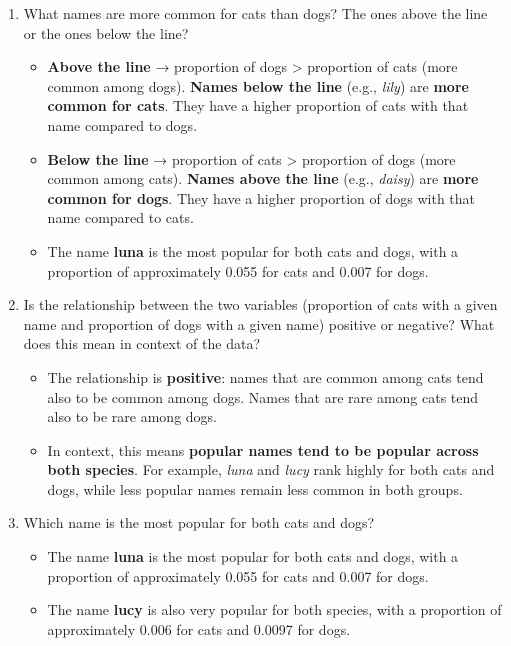 \documentclass[
]{article}
\providecommand{\tightlist}{%
  \setlength{\itemsep}{0pt}\setlength{\parskip}{0pt}}
\begin{document}
\begin{enumerate}
\def\labelenumi{\arabic{enumi}.}
\tightlist
\item
  What names are more common for cats than dogs? The ones above the line
  or the ones below the line?

  \begin{itemize}
  \tightlist
  \item
    \textbf{Above the line} → proportion of dogs \textgreater{}
    proportion of cats (more common among dogs). \textbf{Names below the
    line} (e.g., \emph{lily}) are \textbf{more common for cats}. They
    have a higher proportion of cats with that name compared to dogs.
  \item
    \textbf{Below the line} → proportion of cats \textgreater{}
    proportion of dogs (more common among cats). \textbf{Names above the
    line} (e.g., \emph{daisy}) are \textbf{more common for dogs}. They
    have a higher proportion of dogs with that name compared to cats.
  \item
    The name \textbf{luna} is the most popular for both cats and dogs,
    with a proportion of approximately 0.055 for cats and 0.007 for
    dogs.
  \end{itemize}
\item
  Is the relationship between the two variables (proportion of cats with
  a given name and proportion of dogs with a given name) positive or
  negative? What does this mean in context of the data?

  \begin{itemize}
  \tightlist
  \item
    The relationship is \textbf{positive}: names that are common among
    cats tend also to be common among dogs. Names that are rare among
    cats tend also to be rare among dogs.
  \item
    In context, this means \textbf{popular names tend to be popular
    across both species}. For example, \emph{luna} and \emph{lucy} rank
    highly for both cats and dogs, while less popular names remain less
    common in both groups.
  \end{itemize}
\item
  Which name is the most popular for both cats and dogs?

  \begin{itemize}
  \tightlist
  \item
    The name \textbf{luna} is the most popular for both cats and dogs,
    with a proportion of approximately 0.055 for cats and 0.007 for
    dogs.
  \item
    The name \textbf{lucy} is also very popular for both species, with a
    proportion of approximately 0.006 for cats and 0.0097 for dogs.
  \end{itemize}
\end{enumerate}
\end{document}
